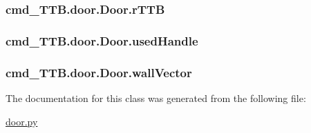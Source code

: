 \subsubsection[{\texorpdfstring{r\+T\+TB}{rTTB}}]{\setlength{\rightskip}{0pt plus 5cm}cmd\+\_\+\+T\+T\+B.\+door.\+Door.\+r\+T\+TB}\hypertarget{classcmd__TTB_1_1door_1_1Door_aeebd5ef44f3ec44c230c157e295b3414}{}\label{classcmd__TTB_1_1door_1_1Door_aeebd5ef44f3ec44c230c157e295b3414}
\subsubsection[{\texorpdfstring{used\+Handle}{usedHandle}}]{\setlength{\rightskip}{0pt plus 5cm}cmd\+\_\+\+T\+T\+B.\+door.\+Door.\+used\+Handle}\hypertarget{classcmd__TTB_1_1door_1_1Door_a711d46f8f16b8142ee76f4e512e90953}{}\label{classcmd__TTB_1_1door_1_1Door_a711d46f8f16b8142ee76f4e512e90953}
\subsubsection[{\texorpdfstring{wall\+Vector}{wallVector}}]{\setlength{\rightskip}{0pt plus 5cm}cmd\+\_\+\+T\+T\+B.\+door.\+Door.\+wall\+Vector}\hypertarget{classcmd__TTB_1_1door_1_1Door_a067030e5b4755f2d2b4340588609901c}{}\label{classcmd__TTB_1_1door_1_1Door_a067030e5b4755f2d2b4340588609901c}


The documentation for this class was generated from the following file\+:\begin{DoxyCompactItemize}
\item 
\hyperlink{door_8py}{door.\+py}\end{DoxyCompactItemize}
